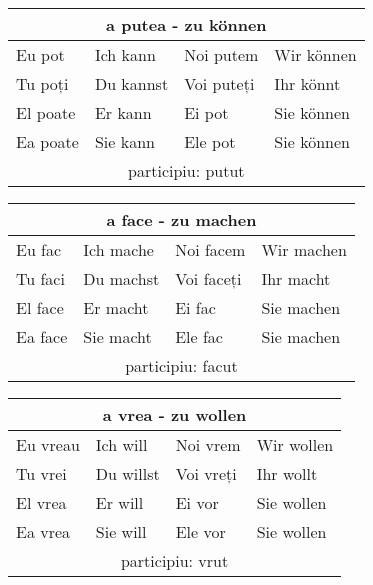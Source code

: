 \documentclass[11pt, oneside]{article}
\begin{document}
%
\begin{center}
  \begin{tabular}{ |p{3.25cm}|p{3.25cm}||p{3.25cm}|p{3.25cm}| }
      \hline
      \multicolumn{4}{|c|}{a putea - zu können} \\
      \hline
      \hline
      Eu pot & Ich kann & Noi putem & Wir können\\
      \hline
      Tu poți & Du kannst & Voi puteți & Ihr könnt\\
      \hline
      El poate & Er kann & Ei pot & Sie können\\ 
      Ea poate & Sie kann & Ele pot & Sie können\\
      \hline
      \multicolumn{4}{|c|}{participiu: putut} \\
      \hline
     \end{tabular}
\end{center}
%
\begin{center}
  \begin{tabular}{ |p{3.25cm}|p{3.25cm}||p{3.25cm}|p{3.25cm}| }
      \hline
      \multicolumn{4}{|c|}{a face - zu machen} \\
      \hline
      \hline
      Eu fac & Ich mache & Noi facem & Wir machen\\
      \hline
      Tu faci & Du machst & Voi faceți & Ihr macht\\
      \hline
      El face & Er macht & Ei fac & Sie machen\\ 
      Ea face & Sie macht & Ele fac & Sie machen\\
      \hline
      \multicolumn{4}{|c|}{participiu: facut} \\
      \hline
     \end{tabular}
\end{center}
%
\begin{center}
  \begin{tabular}{ |p{3.25cm}|p{3.25cm}||p{3.25cm}|p{3.25cm}| }
      \hline
      \multicolumn{4}{|c|}{a vrea - zu wollen} \\
      \hline
      \hline
      Eu vreau & Ich will & Noi vrem & Wir wollen\\
      \hline
      Tu vrei & Du willst & Voi vreți & Ihr wollt\\
      \hline
      El vrea & Er will & Ei vor & Sie wollen\\ 
      Ea vrea & Sie will & Ele vor & Sie wollen\\
      \hline
      \multicolumn{4}{|c|}{participiu: vrut} \\
      \hline
     \end{tabular}
\end{center}
\end{document}
